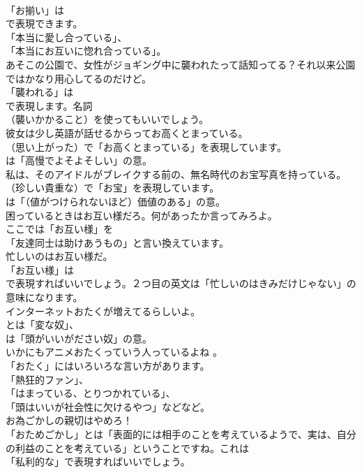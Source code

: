 \documentclass[8pt]{extreport}
\begin{document}
\begin{CJK}{UTF8}{min}
\\	「お揃い」は
\\	で表現できます。
\\	「本当に愛し合っている」、
\\	「本当にお互いに惚れ合っている」。	
\\	あそこの公園で、女性がジョギング中に襲われたって話知ってる？それ以来公園ではかなり用心してるのだけど。 
\\	「襲われる」は 
\\	で表現します。名詞 
\\	（襲いかかること）を使ってもいいでしょう。	
\\	彼女は少し英語が話せるからってお高くとまっている。 
\\	（思い上がった）で「お高くとまっている」を表現しています。
\\	は「高慢でよそよそしい」の意。	
\\	私は、そのアイドルがブレイクする前の、無名時代のお宝写真を持っている。 
\\	（珍しい貴重な）で「お宝」を表現しています。
\\	は「（値がつけられないほど）価値のある」の意。	
\\	困っているときはお互い様だろ。何があったか言ってみろよ。 
\\	ここでは「お互い様」を
\\	「友達同士は助けあうもの」と言い換えています。	
\\	忙しいのはお互い様だ。 
\\	「お互い様」は 
\\	で表現すればいいでしょう。２つ目の英文は「忙しいのはきみだけじゃない」の意味になります。	
\\	インターネットおたくが増えてるらしいよ。 
\\	とは「変な奴」、
\\	は「頭がいいがださい奴」の意。	
\\	いかにもアニメおたくっていう人っているよね 。 
\\	「おたく」にはいろいろな言い方があります。
\\	「熱狂的ファン」、
\\	「はまっている、とりつかれている」、
\\	「頭はいいが社会性に欠けるやつ」などなど。	
\\	お為ごかしの親切はやめろ！ 
\\	「おためごかし」とは「表面的には相手のことを考えているようで、実は、自分の利益のことを考えている」ということですね。これは
\\	「私利的な」で表現すればいいでしょう。	

\end{CJK}
\end{document}
